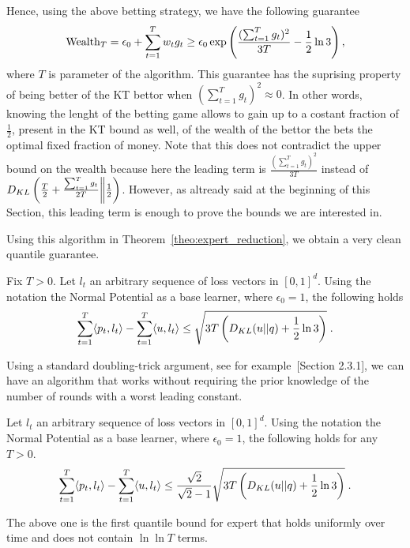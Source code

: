 Hence, using the above betting strategy, we have the following guarantee
\[
\operatorname{Wealth}_T = \epsilon_0 + \sum_{t=1}^T w_t g_t \geq \epsilon_0 \exp\left( \frac{(\sum_{t=1}^T g_t)^2}{3 T} - \frac{1}{2}\ln 3\right),
\]
where $T$ is parameter of the algorithm. This guarantee has the suprising property of being better of the \ac{KT} bettor when $(\sum_{t=1}^T g_t)^2\approx0$. In other words, knowing the lenght of the betting game allows to gain up to a costant fraction of $\frac{1}{2}$, present in the \ac{KT} bound as well, of the wealth of the bettor the bets the optimal fixed fraction of money. Note that this does not contradict the upper bound on the wealth because here the leading term is $\frac{(\sum_{t=1}^T g_t)^2}{3 T}$ instead of $D_{KL}\left(\frac{T}{2}+\frac{\sum_{t=1}^T g_t}{2T}\middle\|\frac{1}{2}\right)$. However, as altready said at the beginning of this Section, this leading term is enough to prove the bounds we are interested in.

Using this algorithm in Theorem~\ref{theo:expert_reduction}, we obtain a very clean quantile guarantee.
\begin{cor}
\label{cor:kt_expert}
Fix $T>0$. Let $l_t$ an arbitrary sequence of loss vectors in $[0,1]^d$. Using the notation the Normal Potential as a base learner, where $\epsilon_0=1$, the following holds
\[
\sum_{t=1}^T \langle p_t, l_t\rangle -\sum_{t=1}^T \langle u , l_t\rangle 
\leq \sqrt{3 T \left(D_{KL}(u||q) +\frac{1}{2}\ln 3 \right)} \; .
\]
\end{cor}

Using a standard doubling-trick argument, see for example~\citet{Shalev-Shwartz12}[Section 2.3.1], we can have an algorithm that works without requiring the prior knowledge of the number of rounds with a worst leading constant.

\begin{cor}
\label{cor:kt_expert_no_t}
Let $l_t$ an arbitrary sequence of loss vectors in $[0,1]^d$. Using the notation the Normal Potential as a base learner, where $\epsilon_0=1$, the following holds for any $T>0$.
\[
\sum_{t=1}^T \langle p_t, l_t\rangle -\sum_{t=1}^T \langle u , l_t\rangle 
\leq \frac{\sqrt{2}}{\sqrt{2}-1}\sqrt{3 T \left(D_{KL}(u||q) + \frac{1}{2}\ln 3 \right)} \; .
\]
\end{cor}

The above one is the first quantile bound for expert that holds uniformly over time and does not contain $\ln \ln T$ terms.